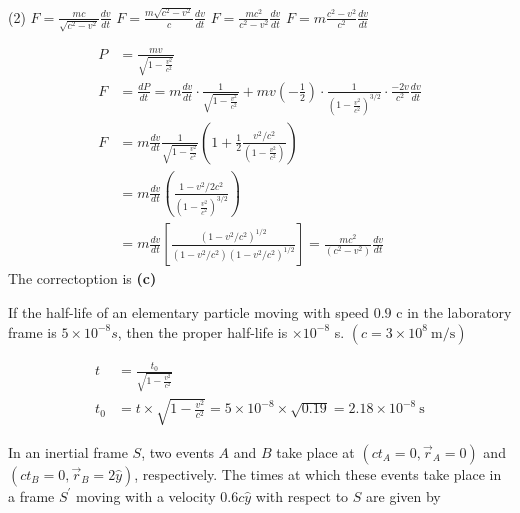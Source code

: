 \begin{enumerate}
\begin{minipage}{\textwidth}
\end{minipage}
\begin{tasks}(2)
	\task[\textbf{A.}] $F=\frac{m c}{\sqrt{c^{2}-v^{2}}} \frac{d v}{d t}$ 
	\task[\textbf{B.}]$F=\frac{m \sqrt{c^{2}-v^{2}}}{c} \frac{d v}{d t}$
	\task[\textbf{C.}]$F=\frac{m c^{2}}{c^{2}-v^{2}} \frac{d v}{d t}$
	\task[\textbf{D.}]$F=m \frac{c^{2}-v^{2}}{c^{2}} \frac{d v}{d t}$
\end{tasks}
\begin{answer}
	\begin{align*}
	P&=\frac{m v}{\sqrt{1-\frac{v^{2}}{c^{2}}}}	\\
	F&=\frac{d P}{d t}=m \frac{d v}{d t} \cdot \frac{1}{\sqrt{1-\frac{v^{2}}{c^{2}}}}+m v\left(-\frac{1}{2}\right) \cdot \frac{1}{\left(1-\frac{v^{2}}{c^{2}}\right)^{3 / 2}} \cdot \frac{-2 v}{c^{2}} \frac{d v}{d t}\\
	F&=m \frac{d v}{d t} \frac{1}{\sqrt{1-\frac{v^{2}}{c^{2}}}}\left(1+\frac{1}{2} \frac{v^{2} / c^{2}}{\left(1-\frac{v^{2}}{c^{2}}\right)}\right)\\
	&=m \frac{d v}{d t}\left(\frac{1-v^{2} / 2 c^{2}}{\left(1-\frac{v^{2}}{c^{2}}\right)^{3 / 2}}\right)\\
	&=m \frac{d v}{d t}\left[\frac{\left(1-v^{2} / c^{2}\right)^{1 / 2}}{\left(1-v^{2} / c^{2}\right)\left(1-v^{2} / c^{2}\right)^{1 / 2}}\right]=\frac{m c^{2}}{\left(c^{2}-v^{2}\right)} \frac{d v}{d t}
	\end{align*}
The correctoption is \textbf{(c)}
\end{answer}
\begin{minipage}{\textwidth}
	\item If the half-life of an elementary particle moving with speed $0.9$ c in the laboratory frame is $5 \times 10^{-8} s$, then the proper half-life is $\times 10^{-8}$ s. $\left(c=3 \times 10^{8} \mathrm{~m} / \mathrm{s}\right)$
\end{minipage}
\begin{answer}
\begin{align*}
	t&=\frac{t_{0}}{\sqrt{1-\frac{v^{2}}{c^{2}}}}\\
	t_{0}&=t \times \sqrt{1-\frac{v^{2}}{c^{2}}}=5 \times 10^{-8} \times \sqrt{0.19}=2.18 \times 10^{-8} \mathrm{~s}
\end{align*}	
\end{answer}
\begin{minipage}{\textwidth}
	\item In an inertial frame $S$, two events $A$ and $B$ take place at $\left(c t_{A}=0, \vec{r}_{A}=0\right)$ and $\left(c t_{B}=0, \vec{r}_{B}=2 \hat{y}\right)$, respectively. The times at which these events take place in a frame $S^{\prime}$ moving with a velocity $0.6 c \hat{y}$ with respect to $S$ are given by

\end{minipage}
\end{enumerate}
